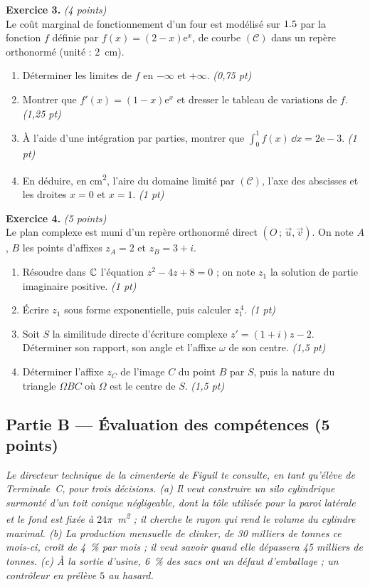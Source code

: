 \smallskip
\noindent\textbf{Exercice 3.} \hfill\textit{(4 points)}\\
Le coût marginal de fonctionnement d'un four est modélisé sur $1.5$ par la fonction
$f$ définie par $f(x)=(2-x)\mathrm{e}^{x}$, de courbe $(\mathcal{C})$ dans un repère orthonormé
(unité : \SI{2}{\centi\metre}).
\begin{enumerate}[label=\arabic*)]
\item Déterminer les limites de $f$ en $-\infty$ et $+\infty$. \hfill\textit{(0,75 pt)}
\item Montrer que $f'(x)=(1-x)\mathrm{e}^{x}$ et dresser le tableau de variations de $f$. \hfill\textit{(1,25 pt)}
\item À l'aide d'une intégration par parties, montrer que $\displaystyle\int_0^{1}f(x)\,\dd x=2\mathrm{e}-3$. \hfill\textit{(1 pt)}
\item En déduire, en \unit{\centi\metre\squared}, l'aire du domaine limité par $(\mathcal{C})$, l'axe des abscisses et les droites $x=0$ et $x=1$. \hfill\textit{(1 pt)}
\end{enumerate}

\smallskip
\noindent\textbf{Exercice 4.} \hfill\textit{(5 points)}\\
Le plan complexe est muni d'un repère orthonormé direct $(O\,;\,\vec u,\vec v)$. On note
$A$, $B$ les points d'affixes $z_A=2$ et $z_B=3+i$.
\begin{enumerate}[label=\arabic*)]
\item Résoudre dans $\mathbb{C}$ l'équation $z^2-4z+8=0$ ; on note $z_1$ la solution de partie imaginaire positive. \hfill\textit{(1 pt)}
\item Écrire $z_1$ sous forme exponentielle, puis calculer $z_1^{\,4}$. \hfill\textit{(1 pt)}
\item Soit $S$ la similitude directe d'écriture complexe $z'=(1+i)z-2$. Déterminer son rapport, son angle et l'affixe $\omega$ de son centre. \hfill\textit{(1,5 pt)}
\item Déterminer l'affixe $z_C$ de l'image $C$ du point $B$ par $S$, puis la nature du triangle $\Omega B C$ où $\Omega$ est le centre de $S$. \hfill\textit{(1,5 pt)}
\end{enumerate}

\subsection*{Partie B — Évaluation des compétences \hfill (5 points)}

\noindent\textit{Le directeur technique de la cimenterie de Figuil te consulte, en tant qu'élève
de Terminale~C, pour trois décisions. (a) Il veut construire un silo cylindrique surmonté
d'un toit conique négligeable, dont la tôle utilisée pour la paroi latérale et le fond est
fixée à $24\pi$~\unit{\metre\squared} ; il cherche le rayon qui rend le volume du cylindre maximal.
(b) La production mensuelle de clinker, de \SI{30}{} milliers de tonnes ce mois-ci, croît de
\SI{4}{\percent} par mois ; il veut savoir quand elle dépassera \SI{45}{} milliers de tonnes.
(c) À la sortie d'usine, \SI{6}{\percent} des sacs ont un défaut d'emballage ; un contrôleur
en prélève $5$ au hasard.}

